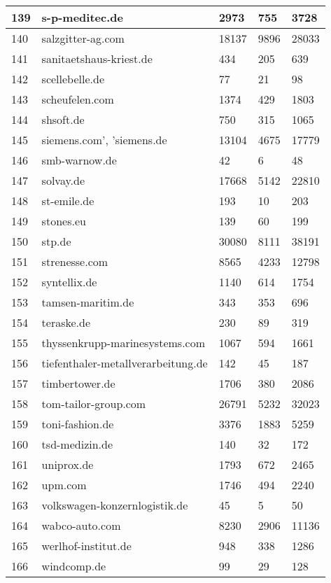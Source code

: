 \begin{longtable}{|m{0.5cm}|m{5cm}|m{2cm}|m{2cm}|m{2cm}|}
	\hline
	139 & s-p-meditec.de & 2973 & 755 & 3728\\
	\hline
	140 & salzgitter-ag.com & 18137 & 9896 & 28033\\
	\hline
	141 & sanitaetshaus-kriest.de & 434 & 205 & 639\\
	\hline
	142 & scellebelle.de & 77 & 21 & 98\\
	\hline
	143 & scheufelen.com & 1374 & 429 & 1803\\
	\hline
	144 & shsoft.de & 750 & 315 & 1065\\
	\hline
	145 & siemens.com', 'siemens.de & 13104 & 4675 & 17779\\
	\hline
	146 & smb-warnow.de & 42 & 6 & 48\\
	\hline
	147 & solvay.de & 17668 & 5142 & 22810\\
	\hline
	148 & st-emile.de & 193 & 10 & 203\\
	\hline
	149 & stones.eu & 139 & 60 & 199\\
	\hline
	150 & stp.de & 30080 & 8111 & 38191\\
	\hline
	151 & strenesse.com & 8565 & 4233 & 12798\\
	\hline
	152 & syntellix.de & 1140 & 614 & 1754\\
	\hline
	153 & tamsen-maritim.de & 343 & 353 & 696\\
	\hline
	154 & teraske.de & 230 & 89 & 319\\
	\hline
	155 & thyssenkrupp-marinesystems.com & 1067 & 594 & 1661\\
	\hline
	156 & tiefenthaler-metallverarbeitung.de & 142 & 45 & 187\\
	\hline
	157 & timbertower.de & 1706 & 380 & 2086\\
	\hline
	158 & tom-tailor-group.com & 26791 & 5232 & 32023\\
	\hline
	159 & toni-fashion.de & 3376 & 1883 & 5259\\
	\hline
	160 & tsd-medizin.de & 140 & 32 & 172\\
	\hline
	161 & uniprox.de & 1793 & 672 & 2465\\
	\hline
	162 & upm.com & 1746 & 494 & 2240\\
	\hline
	163 & volkswagen-konzernlogistik.de & 45 & 5 & 50\\
	\hline
	164 & wabco-auto.com & 8230 & 2906 & 11136\\
	\hline
	165 & werlhof-institut.de & 948 & 338 & 1286\\
	\hline
	166 & windcomp.de & 99 & 29 & 128\\
	\hline

\end{longtable}
